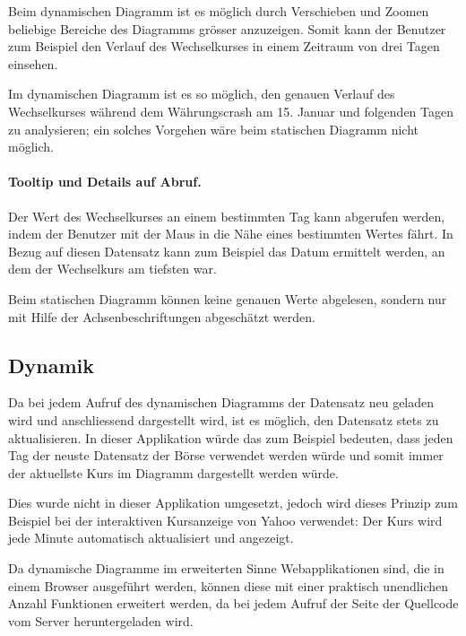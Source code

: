 Beim dynamischen Diagramm ist es möglich durch Verschieben und Zoomen beliebige Bereiche des Diagramms grösser anzuzeigen. Somit kann der Benutzer zum Beispiel den Verlauf des Wechselkurses in einem Zeitraum von drei Tagen einsehen.

Im dynamischen Diagramm ist es so möglich, den genauen Verlauf des Wechselkurses während dem Währungscrash am 15. Januar und folgenden Tagen zu analysieren; ein solches Vorgehen wäre beim statischen Diagramm nicht möglich.

\paragraph{Tooltip und Details auf Abruf.} 

Der Wert des Wechselkurses an einem bestimmten Tag kann abgerufen werden, indem der Benutzer mit der Maus in die Nähe eines bestimmten Wertes fährt. In Bezug auf diesen Datensatz kann zum Beispiel das Datum ermittelt werden, an dem der Wechselkurs am tiefsten war.

Beim statischen Diagramm können keine genauen Werte abgelesen, sondern nur mit Hilfe der Achsenbeschriftungen abgeschätzt werden.

\subsection{Dynamik}

Da bei jedem Aufruf des dynamischen Diagramms der Datensatz neu geladen wird und anschliessend dargestellt wird, ist es möglich, den Datensatz stets zu aktualisieren. In dieser Applikation würde das zum Beispiel bedeuten, dass jeden Tag der neuste Datensatz der Börse verwendet werden würde und somit immer der aktuellste Kurs im Diagramm dargestellt werden würde.

Dies wurde nicht in dieser Applikation umgesetzt, jedoch wird dieses Prinzip zum Beispiel bei der interaktiven Kursanzeige von Yahoo \cite{yahoo} verwendet: Der Kurs wird jede Minute automatisch aktualisiert und angezeigt.

Da dynamische Diagramme im erweiterten Sinne Webapplikationen sind, die in einem Browser ausgeführt werden, können diese mit einer praktisch unendlichen Anzahl Funktionen erweitert werden, da bei jedem Aufruf der Seite der Quellcode vom Server heruntergeladen wird.